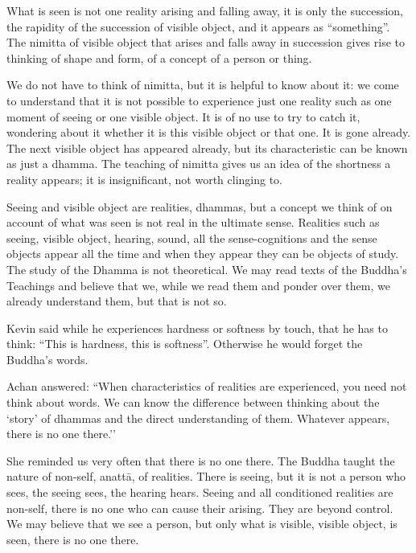 What is seen is not one reality arising and falling away, it is only the succession, the 
rapidity of the succession of visible object, and it appears as ``something''. The 
nimitta of visible object that arises and falls away in succession gives rise to thinking 
of shape and form, of a concept of a person or thing. 

We do not have to think of nimitta, but it is helpful to know about it: we come to understand that it is not possible to experience just one reality such as one moment of 
seeing or one visible object. It is of no use to try to catch it, wondering about it 
whether it is this visible object or that one. It is gone already. The next visible object 
has appeared already, but its characteristic can be known as just a dhamma. The 
teaching of nimitta gives us an idea of the shortness a reality appears; it is insignificant, not worth clinging to. 

Seeing and visible object are realities, dhammas, but a concept we think of on account of what was seen is not real in the ultimate sense. Realities such as seeing, visible object, hearing, sound, all the sense-cognitions and the sense objects appear all 
the time and when they appear they can be objects of study. The study of the 
Dhamma is not theoretical. We may read texts of the Buddha’s Teachings and believe 
that we, while we read them and ponder over them, we already understand them, but 
that is not so. 

Kevin said while he experiences hardness or softness by touch, that he has to think: 
``This is hardness, this is softness''. Otherwise he would forget the Buddha’s words. 

Achan answered: ``When characteristics of realities are experienced, you need not 
think about words. We can know the difference between thinking about the `story’ of 
dhammas and the direct understanding of them. Whatever appears, there is no one 
there.'' 

She reminded us very often that there is no one there. The Buddha taught the nature 
of non-self, anattā, of realities. There is seeing, but it is not a person who sees, the 
seeing sees, the hearing hears. Seeing and all conditioned realities are non-self, there 
is no one who can cause their arising. They are beyond control. We may believe that 
we see a person, but only what is visible, visible object, is seen, there is no one there. 


